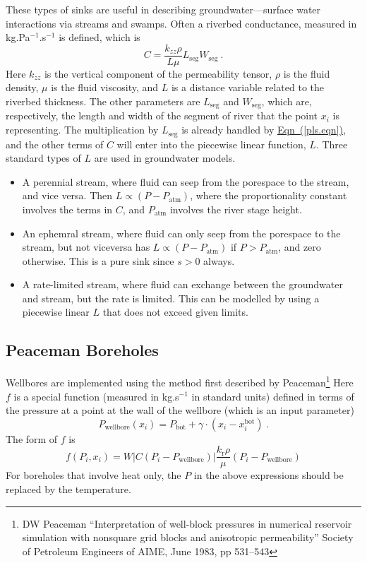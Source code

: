 \documentclass[12pt]{report}
\begin{document}
These types of sinks are useful in describing groundwater---surface
water interactions via streams and swamps.  Often a riverbed
conductance, measured in kg.Pa$^{-1}$.s$^{-1}$ is defined, which is
\begin{equation}
C = \frac{k_{zz}\rho}{L\mu}L_{\mathrm{seg}}W_{\mathrm{seg}} \ .
\end{equation}
Here $k_{zz}$ is the vertical component of the permeability tensor,
$\rho$ is the fluid density, $\mu$ is the fluid viscosity, and $L$ is
a distance variable related to the riverbed thickness.  The other
parameters are $L_{\mathrm{seg}}$ and $W_{\mathrm{seg}}$, which are,
respectively, the length and width of the segment of river that the
point $x_{i}$ is representing.  The multiplication by
$L_{\mathrm{seg}}$ is already handled by
\hyperref[pls.eqn]{Eqn~(\ref*{pls.eqn})}, and the other terms of $C$
will enter into the piecewise linear function, $L$.  Three standard
types of $L$ are used in groundwater models.
\begin{itemize}
\item A perennial stream, where fluid can seep from the porespace to
  the stream, and vice versa.  Then $L \propto (P -
  P_{\mathrm{atm}})$, where the proportionality constant involves the
  terms in $C$, and $P_{\mathrm{atm}}$ involves the river stage
  height.
\item An ephemral stream, where fluid can only seep from the porespace
  to the stream, but not viceversa has $L\propto (P-P_{\mathrm{atm}})$
  if $P>P_{\mathrm{atm}}$, and zero otherwise.  This is a pure sink
  since $s>0$ always.
\item A rate-limited stream, where fluid can exchange between the
  groundwater and stream, but the rate is limited.  This can be
  modelled by using a piecewise linear $L$ that does not exceed given
  limits.
\end{itemize}


\subsection{Peaceman Boreholes}

Wellbores are implemented using the method first described by
Peaceman\footnote{DW Peaceman ``Interpretation of well-block pressures
  in numerical reservoir simulation with nonsquare grid blocks and
  anisotropic permeability'' Society of Petroleum Engineers of AIME,
  June 1983, pp 531--543}  Here $f$ is a
special function (measured in kg.s$^{-1}$ in standard
units) defined in terms of the pressure at a
point at the wall of the wellbore (which is an input parameter)
\begin{equation}
P_{\mathrm{wellbore}}(x_{i}) = P_{\mathrm{bot}} + \gamma \cdot (x_{i} -
x_{i}^{\mathrm{bot}}) \ .
\end{equation}
The form of $f$ is
\begin{equation}
f(P_{i}, x_{i}) =
W \left|C(P_{i}-P_{\mathrm{wellbore}})\right|
\frac{k_{\mathrm{r}}\rho}{\mu}(P_{i} - P_{\mathrm{wellbore}})
\end{equation}
For boreholes that involve heat only, the $P$ in the above expressions
should be replaced by the temperature.
\end{document}
